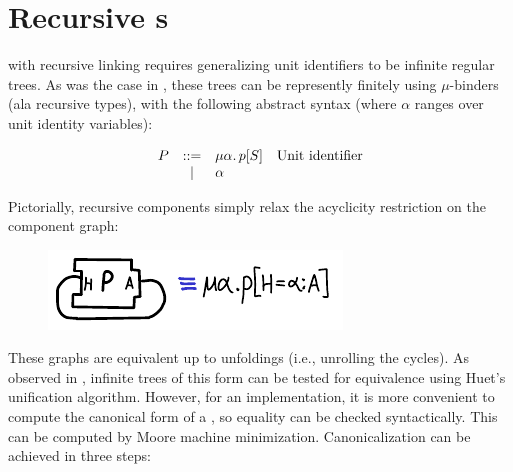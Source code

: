 \section{Recursive \uid{}s}
\label{sec:recursive-uids}


\Backpack{} with recursive linking requires generalizing unit
identifiers to be infinite regular trees.  As was the case
in \OldBackpack{}, these trees can be
represently finitely using $\mu$-binders (ala recursive types),
with the following abstract syntax (where $\alpha$ ranges over
unit identity variables):

\[
\begin{array}{rcll}
  \UP &::=& \mu\alpha.\, \icid{\Up}{S} & \text{\Uid} \\
      & | & \alpha \\
\end{array}
\]




Pictorially, recursive components simply relax the acyclicity restriction on
the component graph:

\begin{figure}[H]
\center\includegraphics{figures/recursive-unit-identifier.pdf}
\end{figure}

These graphs are equivalent up to unfoldings (i.e., unrolling the
cycles).
As observed in \OldBackpack{}, infinite trees of this form
can be tested for equivalence using Huet's unification algorithm.
However, for an implementation, it is more convenient to compute the canonical form
of a \uid{}, so equality can be checked syntactically.  This can be
computed by Moore machine minimization.  Canonicalization can be achieved
in three steps:

